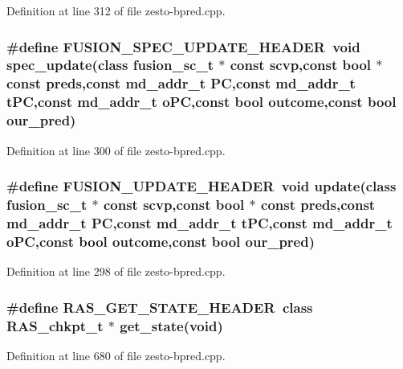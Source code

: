 Definition at line 312 of file zesto-bpred.cpp.
\subsubsection[{FUSION\_\-SPEC\_\-UPDATE\_\-HEADER}]{\setlength{\rightskip}{0pt plus 5cm}\#define FUSION\_\-SPEC\_\-UPDATE\_\-HEADER~void spec\_\-update(class {\bf fusion\_\-sc\_\-t} $\ast$ const scvp,const bool $\ast$ const preds,const {\bf md\_\-addr\_\-t} PC,const {\bf md\_\-addr\_\-t} tPC,const {\bf md\_\-addr\_\-t} oPC,const bool outcome,const bool our\_\-pred)}\label{zesto-bpred_8cpp_74381a046bb8e34b49e4765af288f3e4}




Definition at line 300 of file zesto-bpred.cpp.
\subsubsection[{FUSION\_\-UPDATE\_\-HEADER}]{\setlength{\rightskip}{0pt plus 5cm}\#define FUSION\_\-UPDATE\_\-HEADER~void update(class {\bf fusion\_\-sc\_\-t} $\ast$ const scvp,const bool $\ast$ const preds,const {\bf md\_\-addr\_\-t} PC,const {\bf md\_\-addr\_\-t} tPC,const {\bf md\_\-addr\_\-t} oPC,const bool outcome,const bool our\_\-pred)}\label{zesto-bpred_8cpp_d4cc51d419490f6cb55a6e302a41605c}




Definition at line 298 of file zesto-bpred.cpp.
\subsubsection[{RAS\_\-GET\_\-STATE\_\-HEADER}]{\setlength{\rightskip}{0pt plus 5cm}\#define RAS\_\-GET\_\-STATE\_\-HEADER~class {\bf RAS\_\-chkpt\_\-t} $\ast$ get\_\-state(void)}\label{zesto-bpred_8cpp_33a99021b7660143d2c8d98296e74882}




Definition at line 680 of file zesto-bpred.cpp.
